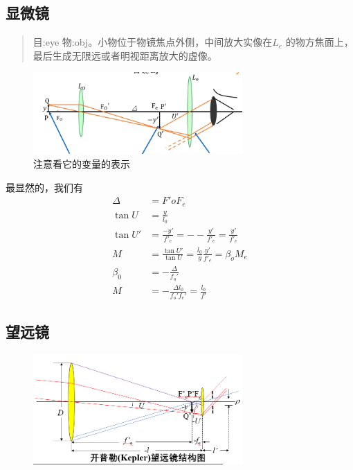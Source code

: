 \subsection{显微镜}
\begin{quote}
{\qquad{}\ccwd\kaishu{}
目:eye 物:obj。小物位于物镜焦点外侧，中间放大实像在$L_e$ 的物方焦面上，最后生成无限远或者明视距离放大的虚像。
}
\end{quote}
        \begin{figure}[H]
            \centering
            \includegraphics[width=8cm]{img/6.2.png}
            \caption*{注意看它的变量的表示}
            \end{figure}
最显然的，我们有
\begin{align}
    \Delta&=F'oF_e \tag{6.2.1.a} \\
     \tan U&=\frac{y}{l_0} \tag{6.2.1.b} \\
     \tan U'&=\frac{-y'}{f'_e}=--\frac{y'}{f'_e}=\frac{y'}{f'_e} \tag{6.2.1.c} \\
     M&=\frac{\tan U' }{\tan U}=\frac{l_0}{y}\frac{y'}{f'_e}=\beta_o M_e\tag{6.2.1.d}\\
     \beta_0&=-\frac{\Delta}{f_o'}\tag{6.2.1.e}\\     
     M&=-\frac{\Delta l_0}{f_o'f_e'}=\frac{l_0}{f'}\tag{6.2.1.f}
\end{align}
\subsection{望远镜}
        \begin{figure}[H]
            \centering
            \includegraphics[width=8cm]{img/6.3.png}
            \end{figure}

